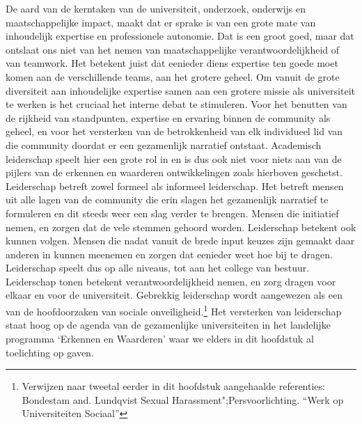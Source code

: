 \documentclass[empirical, authordate, ]{new-jote-article}
\begin{document}
	De aard van de kerntaken van de universiteit, onderzoek, onderwijs en maatschappelijke impact, maakt dat er sprake is van een grote mate van inhoudelijk expertise en professionele autonomie. Dat is een groot goed, maar dat ontslaat ons niet van het nemen van maatschappelijke verantwoordelijkheid of van teamwork. Het betekent juist dat eenieder diens expertise ten goede moet komen aan de verschillende teams, aan het grotere geheel. Om vanuit de grote diversiteit aan inhoudelijke expertise samen aan een grotere missie als universiteit te werken is het cruciaal het interne debat te stimuleren. Voor het benutten van de rijkheid van standpunten, expertise en ervaring binnen de community als geheel, en voor het versterken van de betrokkenheid van elk individueel lid van die community doordat er een gezamenlijk narratief ontstaat. Academisch leiderschap speelt hier een grote rol in en is dus ook niet voor niets aan van de pijlers van de erkennen en waarderen ontwikkelingen zoals hierboven geschetst. Leiderschap betreft zowel formeel als informeel leiderschap. Het betreft mensen uit alle lagen van de community die erin slagen het gezamenlijk narratief te formuleren en dit steeds weer een slag verder te brengen. Mensen die initiatief nemen, en zorgen dat de vele stemmen gehoord worden. Leiderschap betekent ook kunnen volgen. Mensen die nadat vanuit de brede input keuzes zijn gemaakt daar anderen in kunnen meenemen en zorgen dat eenieder weet hoe bij te dragen. Leiderschap speelt dus op alle niveaus, tot aan het college van bestuur. Leiderschap tonen betekent verantwoordelijkheid nemen, en zorg dragen voor elkaar en voor de universiteit. Gebrekkig leiderschap wordt aangewezen als een van de hoofdoorzaken van sociale onveiligheid.\footnote{Verwijzen naar tweetal eerder in dit hoofdstuk aangehaalde referenties: Bondestam and. Lundqvist Sexual Harassment";Persvoorlichting. “Werk op Universiteiten Sociaal” } Het versterken van leiderschap staat hoog op de agenda van de gezamenlijke universiteiten in het landelijke programma ‘Erkennen en Waarderen' waar we elders in dit hoofdstuk al toelichting op gaven.
\end{document}
